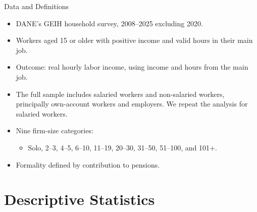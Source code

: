\documentclass[aspectratio=169,11pt]{beamer}
\begin{document}
\begin{frame}{Data and Definitions}
  \small
  \begin{itemize}
    \item DANE's GEIH household survey, 2008--2025 excluding 2020.
    \item Workers aged 15 or older with positive income and valid hours in their main job.
    \item Outcome: real hourly labor income, using income and hours from the main job.
    \item The full sample includes salaried workers and non-salaried workers, principally own-account workers and employers. We repeat the analysis for salaried workers.
    \item Nine firm-size categories:  
    \begin{itemize}
        \item Solo, 2--3, 4--5, 6--10, 11--19, 20--30, 31--50, 51--100, and 101+.
    \end{itemize}
    \item Formality defined by contribution to pensions.
  \end{itemize}
\end{frame}

\section{Descriptive Statistics}
\end{document}
